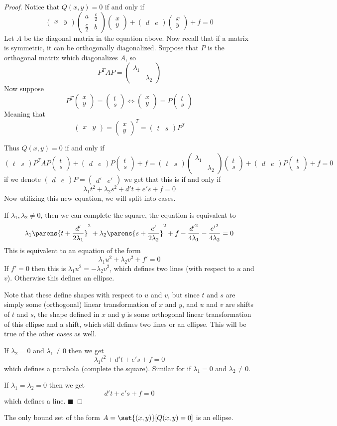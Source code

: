 \documentclass[10pt]{article}
\def\pmat#1{\begin{pmatrix} #1 \end{pmatrix}}
\def\pmat#1{\begin{pmatrix}#1\end{pmatrix}}
\def\qed{%
    \ifmmode%
        \eqno\blacksquare%
    \else%
        \hskip1cm\allowbreak\hbox{}\nobreak\hfill$\blacksquare$%
    \fi%
}
\begin{document}
\begin{proof}

    Notice that $Q(x,y)=0$ if and only if
    \[ \pmat{x&y}\pmat{a&\frac c2\\\frac c2&b}\pmat{x\\y} + \pmat{d&e}\pmat{x\\y}+f = 0 \]
    Let $A$ be the diagonal matrix in the equation above.
    Now recall that if a matrix is symmetric, it can be orthogonally diagonalized.
    Suppose that $P$ is the orthogonal matrix which diagonalizes $A$, so
    \[ P^TAP = \pmat{\lambda_1\\&\lambda_2} \]
    Now suppose
    \[ P^T\pmat{x\\y} = \pmat{t\\s} \iff \pmat{x\\y} = P\pmat{t\\s} \]
    Meaning that
    \[ \pmat{x&y} = \pmat{x\\y}^T = \pmat{t&s}P^T \]

    Thus $Q(x,y)=0$ if and only if
    \[ \pmat{t&s}P^TAP\pmat{t\\s} + \pmat{d&e}P\pmat{t\\s} + f = \pmat{t&s}\pmat{\lambda_1\\&\lambda_2}\pmat{t\\s} + \pmat{d&e}P\pmat{t\\s}+f = 0 \]
    if we denote $\pmat{d&e}P=\pmat{d'&e'}$ we get that this is if and only if
    \[ \lambda_1t^2+\lambda_2s^2 + d't + e's + f = 0 \]
    Now utilizing this new equation, we will split into cases.

    \benum
        \item If $\lambda_1,\lambda_2\neq0$, then we can complete the square, the equation is equivalent to
        \[ \lambda_1\parens{t+\frac{d'}{2\lambda_1}}^2 + \lambda_2\parens{s+\frac{e'}{2\lambda_2}}^2 + f-\frac{{d'}^2}{4\lambda_1}-\frac{{e'}^2}{4\lambda_2} = 0 \]
        This is equivalent to an equation of the form
        \[ \lambda_1u^2 + \lambda_2v^2 + f' = 0 \]
        If $f'=0$ then this is $\lambda_1u^2=-\lambda_2v^2$, which defines two lines (with respect to $u$ and $v$).
        Otherwise this defines an ellipse.

        Note that these define shapes with respect to $u$ and $v$, but since $t$ and $s$ are simply some (orthogonal) linear transformation of $x$ and $y$, and $u$ and $v$ are shifts of $t$ and $s$,
        the shape defined in $x$ and $y$ is some orthogonal linear transformation of this ellipse and a shift, which still defines two lines or an ellipse.
        This will be true of the other cases as well.

        \item If $\lambda_2=0$ and $\lambda_1\neq0$ then we get
        \[ \lambda_1t^2 + d't + e's + f = 0 \]
        which defines a parabola (complete the square).
        Similar for if $\lambda_1=0$ and $\lambda_2\neq0$.

        \item If $\lambda_1=\lambda_2=0$ then we get
        \[ d't + e's + f = 0 \]
        which defines a line.
        \qed
    \eenum

\end{proof}

\begin{coro*}

    The only bound set of the form $A=\set{(x,y)}[Q(x,y)=0]$ is an ellipse.

\end{coro*}
\end{document}
